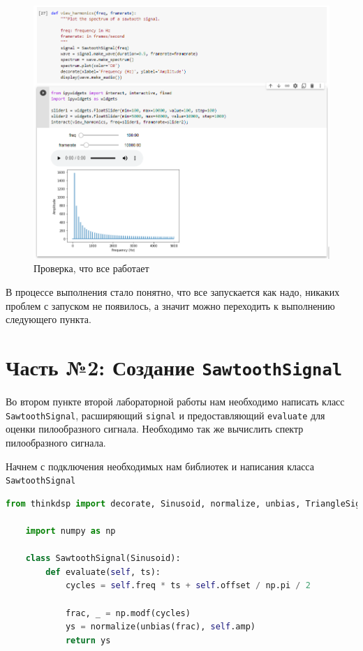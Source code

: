 \documentclass[a4paper]{article}
\begin{document}
             \begin{figure}[h]
                \centering
                \includegraphics[width=\textwidth]{ex_1_all_work.png}
                \caption{Проверка, что все работает}
                \label{fig:check_it_works}
            \end{figure}
            
            В процессе выполнения стало понятно, что все запускается как надо, никаких проблем с запуском не появилось, а значит можно переходить к выполнению следующего пункта.
    
    \newpage
        \section{Часть №2: Создание \texttt{SawtoothSignal}}
            Во втором пункте второй лабораторной работы нам необходимо написать класс \texttt{SawtoothSignal}, расширяющий \texttt{signal} и предоставляющий \texttt{evaluate} для оценки пилообразного сигнала. Необходимо так же вычислить спектр пилообразного сигнала.
            
            Начнем с подключения необходимых нам библиотек и написания класса \\
            \texttt{SawtoothSignal}
            
\begin{lstlisting}[language=Python, caption= Создание класса \texttt{SawtoothSignal}]
    from thinkdsp import decorate, Sinusoid, normalize, unbias, TriangleSignal, SquareSignal, SinSignal, CosSignal, ParabolicSignal

    import numpy as np

    class SawtoothSignal(Sinusoid):
        def evaluate(self, ts):
            cycles = self.freq * ts + self.offset / np.pi / 2
            
            frac, _ = np.modf(cycles)
            ys = normalize(unbias(frac), self.amp)
            return ys
\end{lstlisting}    
            
\end{document}
